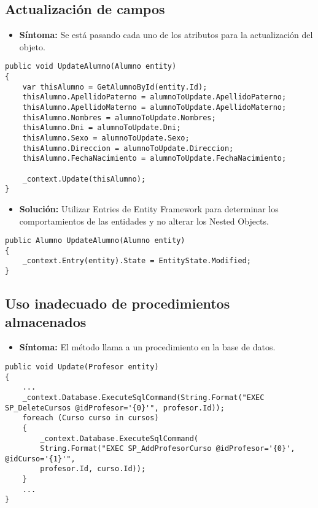 \subsection{Actualización de campos}
\begin{itemize}
	\item \textbf{Síntoma:} Se está pasando cada uno de los atributos para la actualización del objeto.
\end{itemize}

\begin{lstlisting}[language={[Sharp]C}]
public void UpdateAlumno(Alumno entity)
{
	var thisAlumno = GetAlumnoById(entity.Id);
	thisAlumno.ApellidoPaterno = alumnoToUpdate.ApellidoPaterno;
	thisAlumno.ApellidoMaterno = alumnoToUpdate.ApellidoMaterno;
	thisAlumno.Nombres = alumnoToUpdate.Nombres;
	thisAlumno.Dni = alumnoToUpdate.Dni;
	thisAlumno.Sexo = alumnoToUpdate.Sexo;
	thisAlumno.Direccion = alumnoToUpdate.Direccion;
	thisAlumno.FechaNacimiento = alumnoToUpdate.FechaNacimiento;
	
	_context.Update(thisAlumno);
}
\end{lstlisting}

\begin{itemize}
	\item \textbf{Solución:} Utilizar Entries de Entity Framework para determinar los comportamientos de las entidades y no alterar los Nested Objects.
\end{itemize}

\begin{lstlisting}[language={[Sharp]C}]
public Alumno UpdateAlumno(Alumno entity)
{
	_context.Entry(entity).State = EntityState.Modified;
}
\end{lstlisting}

	

\subsection{Uso inadecuado de procedimientos almacenados}
\begin{itemize}
	\item \textbf{Síntoma:} El método llama a un procedimiento en la base de datos.
\end{itemize}

\begin{lstlisting}[language={[Sharp]C}]
public void Update(Profesor entity)
{
	...
	_context.Database.ExecuteSqlCommand(String.Format("EXEC SP_DeleteCursos @idProfesor='{0}'", profesor.Id));
	foreach (Curso curso in cursos)
	{
		_context.Database.ExecuteSqlCommand(
		String.Format("EXEC SP_AddProfesorCurso @idProfesor='{0}', @idCurso='{1}'", 
		profesor.Id, curso.Id));
	}
	...
}
\end{lstlisting}

